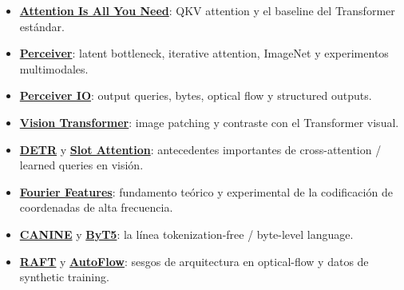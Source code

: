 \documentclass[a4paper]{article}
\begin{document}
{\small
\begin{itemize}[nosep,leftmargin=*]
  \item \href{https://arxiv.org/abs/1706.03762}{\textbf{Attention Is All You Need}}: QKV attention y el baseline del Transformer estándar.
  \item \href{https://arxiv.org/abs/2103.03206}{\textbf{Perceiver}}: latent bottleneck, iterative attention, ImageNet y experimentos multimodales.
  \item \href{https://arxiv.org/abs/2107.14795}{\textbf{Perceiver IO}}: output queries, bytes, optical flow y structured outputs.
  \item \href{https://arxiv.org/abs/2010.11929}{\textbf{Vision Transformer}}: image patching y contraste con el Transformer visual.
  \item \href{https://arxiv.org/abs/2005.12872}{\textbf{DETR}} y \href{https://arxiv.org/abs/2006.15055}{\textbf{Slot Attention}}: antecedentes importantes de cross-attention / learned queries en visión.
  \item \href{https://arxiv.org/abs/2006.10739}{\textbf{Fourier Features}}: fundamento teórico y experimental de la codificación de coordenadas de alta frecuencia.
  \item \href{https://arxiv.org/abs/2103.06874}{\textbf{CANINE}} y \href{https://arxiv.org/abs/2105.13626}{\textbf{ByT5}}: la línea tokenization-free / byte-level language.
  \item \href{https://arxiv.org/abs/2003.12039}{\textbf{RAFT}} y \href{https://arxiv.org/abs/2104.14544}{\textbf{AutoFlow}}: sesgos de arquitectura en optical-flow y datos de synthetic training.
\end{itemize}
}
\end{document}
